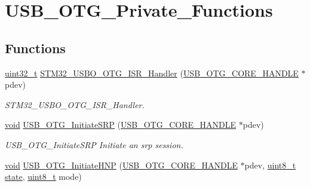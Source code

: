 \hypertarget{group___u_s_b___o_t_g___private___functions}{\section{U\-S\-B\-\_\-\-O\-T\-G\-\_\-\-Private\-\_\-\-Functions}
\label{group___u_s_b___o_t_g___private___functions}
}
\subsection*{Functions}
\begin{DoxyCompactItemize}
\item 
\hyperlink{stdint_8h_a435d1572bf3f880d55459d9805097f62}{uint32\-\_\-t} \hyperlink{group___u_s_b___o_t_g___private___functions_ga3dc36b973b1f63dfabfe88fd59561b36}{S\-T\-M32\-\_\-\-U\-S\-B\-O\-\_\-\-O\-T\-G\-\_\-\-I\-S\-R\-\_\-\-Handler} (\hyperlink{group___u_s_b___c_o_r_e___exported___types_gaf76054c11eb8a3367907aad7ae700e80}{U\-S\-B\-\_\-\-O\-T\-G\-\_\-\-C\-O\-R\-E\-\_\-\-H\-A\-N\-D\-L\-E} $\ast$pdev)
\begin{DoxyCompactList}\small\item\em S\-T\-M32\-\_\-\-U\-S\-B\-O\-\_\-\-O\-T\-G\-\_\-\-I\-S\-R\-\_\-\-Handler. \end{DoxyCompactList}\item 
\hyperlink{group___n_a_m_e_ga18028b8badbf1ea7e704ccac3c488e82}{void} \hyperlink{group___u_s_b___o_t_g___private___functions_ga4bfc9fd1ef8f68a127538897a802e8f7}{U\-S\-B\-\_\-\-O\-T\-G\-\_\-\-Initiate\-S\-R\-P} (\hyperlink{group___u_s_b___c_o_r_e___exported___types_gaf76054c11eb8a3367907aad7ae700e80}{U\-S\-B\-\_\-\-O\-T\-G\-\_\-\-C\-O\-R\-E\-\_\-\-H\-A\-N\-D\-L\-E} $\ast$pdev)
\begin{DoxyCompactList}\small\item\em U\-S\-B\-\_\-\-O\-T\-G\-\_\-\-Initiate\-S\-R\-P Initiate an srp session. \end{DoxyCompactList}\item 
\hyperlink{group___n_a_m_e_ga18028b8badbf1ea7e704ccac3c488e82}{void} \hyperlink{group___u_s_b___o_t_g___private___functions_gaaa66a4c4f699e9b8acac8bb9c44d74ff}{U\-S\-B\-\_\-\-O\-T\-G\-\_\-\-Initiate\-H\-N\-P} (\hyperlink{group___u_s_b___c_o_r_e___exported___types_gaf76054c11eb8a3367907aad7ae700e80}{U\-S\-B\-\_\-\-O\-T\-G\-\_\-\-C\-O\-R\-E\-\_\-\-H\-A\-N\-D\-L\-E} $\ast$pdev, \hyperlink{stdint_8h_aba7bc1797add20fe3efdf37ced1182c5}{uint8\-\_\-t} \hyperlink{posix_2posix_2pios__flashfs__logfs_8c_a13a6109e91ad12705df96a0f2743c630}{state}, \hyperlink{stdint_8h_aba7bc1797add20fe3efdf37ced1182c5}{uint8\-\_\-t} mode)

\end{DoxyCompactItemize}
